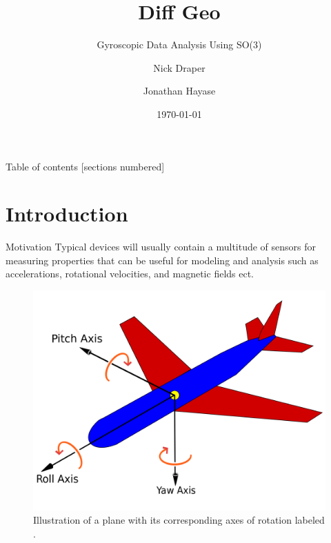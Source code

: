 \documentclass[10pt]{beamer}
\title{Diff Geo}
\subtitle{Gyroscopic Data Analysis Using SO(3)}
\date{\today}
\author{Nick Draper \and Jonathan Hayase}
\institute{Math 143 -- Differential Geometry Seminar -- Spring 2018}
\begin{document}
\maketitle

\begin{frame}{Table of contents}
    [sections numbered]
    \tableofcontents[hideallsubsections]
\end{frame}

\section{Introduction}

\begin{frame} {Motivation}
Typical devices will usually contain a multitude of sensors for measuring properties that can be useful for modeling and analysis such as accelerations, rotational velocities, and magnetic fields ect. 
\begin{figure}
\includegraphics[scale=0.08]{images/plane.png}
\caption{Illustration of a plane with its corresponding axes of rotation labeled \cite{plane1}.}
\end{figure}
\end{frame}
\end{document}
